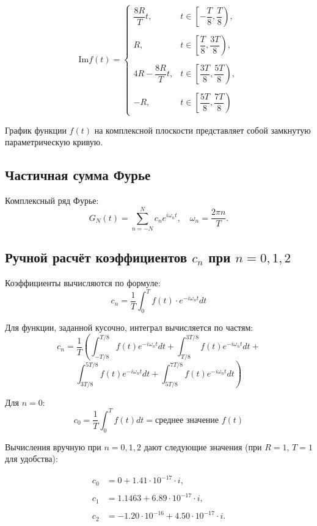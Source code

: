 \[
\text{Im} f(t) =
\begin{cases}
\dfrac{8R}{T} t, & t \in \left[ -\dfrac{T}{8}, \dfrac{T}{8} \right), \\\\
R, & t \in \left[ \dfrac{T}{8}, \dfrac{3T}{8} \right), \\\\
4R - \dfrac{8R}{T} t, & t \in \left[ \dfrac{3T}{8}, \dfrac{5T}{8} \right), \\\\
- R, & t \in \left[ \dfrac{5T}{8}, \dfrac{7T}{8} \right)
\end{cases}
\]

График функции $f(t)$ на комплексной плоскости представляет собой замкнутую параметрическую кривую.

\subsection*{Частичная сумма Фурье}

Комплексный ряд Фурье:
\[
G_N(t) = \sum_{n=-N}^{N} c_n e^{i \omega_n t}, \quad \omega_n = \frac{2\pi n}{T}.
\]

\subsection*{Ручной расчёт коэффициентов $c_n$ при $n = 0, 1, 2$}

Коэффициенты вычисляются по формуле:
\[
c_n = \frac{1}{T} \int_{0}^{T} f(t) \cdot e^{-i \omega_n t} dt
\]

Для функции, заданной кусочно, интеграл вычисляется по частям:
\[
c_n = \frac{1}{T} \left(
\int_{-T/8}^{T/8} f(t) e^{-i\omega_n t} dt +
\int_{T/8}^{3T/8} f(t) e^{-i\omega_n t} dt +
\right.
\]
\[
\left.
\int_{3T/8}^{5T/8} f(t) e^{-i\omega_n t} dt +
\int_{5T/8}^{7T/8} f(t) e^{-i\omega_n t} dt
\right)
\]

Для $n = 0$:
\[
c_0 = \frac{1}{T} \int_{0}^{T} f(t) dt = \text{среднее значение } f(t)
\]

Вычисления вручную при $n = 0, 1, 2$ дают следующие значения (при $R = 1$, $T = 1$ для удобства):

\begin{align*}
    c_0 &= 0 + 1.41 \cdot 10^{-17} \cdot i, \\\\
    c_1 &= 1.1463 + 6.89 \cdot 10^{-17} \cdot i, \\\\
    c_2 &= -1.20 \cdot 10^{-16} + 4.50 \cdot 10^{-17} \cdot i.
\end{align*}

